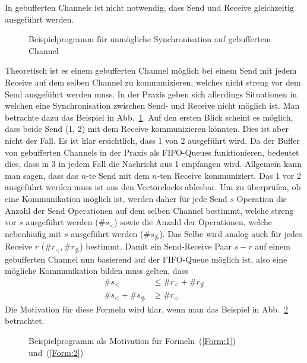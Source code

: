 In gebufferten Channels ist nicht notwendig, dass Send und Receive gleichzeitig
ausgeführt werden.
\begin{figure}[h!]
  \centering
  
  \caption{Beispielprogramm für unmögliche Synchronisation auf gebuffertem Channel}
  \label{Chap:Analyze-Sec:Channel-SubSec:Dangling-Fig:BufferedNoSync}
\end{figure}
Theoretisch ist es einem gebufferten Channel möglich bei einem Send mit 
jedem Receive auf dem selben Channel zu kommunizieren, welches nicht 
streng vor dem Send ausgeführt werden muss. In der Praxis geben sich allerdings 
Situationen in welchen eine Synchronisation zwischen Send- und Receive nicht 
möglich ist. Man betrachte dazu das Beispiel in 
Abb.~\ref{Chap:Analyze-Sec:Channel-SubSec:Dangling-Fig:BufferedNoSync}.
Auf den ersten Blick scheint es möglich, dass beide Send (1, 2) mit dem 
Receive kommunizieren könnten. Dies ist aber nicht der Fall.
Es ist klar ersichtlich, dass 1 von 2 ausgeführt wird. Da der Buffer von 
gebufferten Channels in der Praxis als FIFO-Queues funktionieren, 
bedeutet dies, dass in 3 in jedem Fall die Nachricht aus 1 empfangen wird.
Allgemein kann man sagen, dass das $n$-te Send mit dem $n$-ten Receive 
kommuniziert. 
Das 1 vor 2 ausgeführt 
werden muss ist aus den Vectorclocks ablesbar. Um zu überprüfen, 
ob eine Kommunikation möglich ist, werden daher für jede Send $s$ Operation 
die Anzahl der Send Operationen auf dem selben Channel bestimmt, welche streng vor $s$ 
ausgeführt werden ($\#s_{<}$) sowie die Anzahl der Operationen, welche nebenläufig mit $s$ 
ausgeführt werden ($\#s_{\not\lessgtr}$). Das Selbe wird analog auch 
für jedes Receive $r$ ($\#r_{ <}, \#r_{\not\lessgtr}$) bestimmt. 
Damit ein Send-Receive Paar $s - r$ auf 
einem gebufferten Channel nun basierend auf der FIFO-Queue möglich ist, 
also eine mögliche Kommunikation bilden muss gelten, dass 
\begin{align}
  \#s_{<} &\leq \#r_{<} + \#r_{\not\lessgtr}\label{Form:1}\\
  \#s_{<} + \#s_{\not\lessgtr} &\geq \#r_{<}\label{Form:2}
\end{align}
Die Motivation für diese Formeln wird klar, wenn man das Beispiel in 
Abb.~\ref{Chap:Analyze-Sec:Channel-SubSec:Dangling-Fig:BufferForm} betrachtet.
\begin{figure}[h!]
  \centering
  
  \caption{Beispielprogramm als Motivation für Formeln~(\ref{Form:1}) und~(\ref{Form:2})}
  \label{Chap:Analyze-Sec:Channel-SubSec:Dangling-Fig:BufferForm}
\end{figure}
